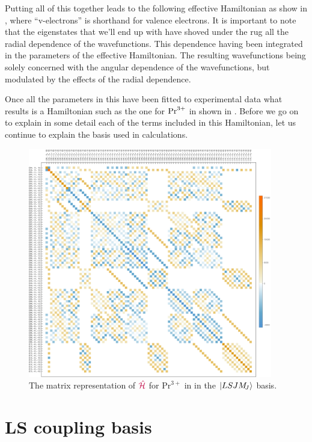 \documentclass[11pt, twoside,openright]{article}
\begin{document}
Putting all of this together leads to the following effective Hamiltonian as show in , where ``v-electrons'' is shorthand for valence electrons. It is important to note that the eigenstates that we'll end up with have shoved under the rug all the radial dependence of the wavefunctions. This dependence having been integrated in the parameters of the effective Hamiltonian. The resulting wavefunctions being solely concerned with the angular dependence of the wavefunctions, but modulated by the effects of the radial dependence.



Once all the parameters in this \hamilton have been fitted to experimental data what results is a Hamiltonian such as the one for $\textrm{Pr}^{3+}$ in \LaFthree shown in . Before we go on to explain in some detail each of the terms included in this Hamiltonian, let us continue to explain the basis used in calculations.

\begin{figure}[h!]
	\begin{center}
		\includegraphics[width=0.95\textwidth]{./figures/Prplot.pdf}
	\end{center}
	\caption{The matrix representation of $\textcolor{purple}{\hat{\mathcal{H}}}$ for $\text{Pr}^{3+}$ in \LaFthree in the $|LSJM_{\!{J}}\rangle$ basis.}
	\label{fig:Pr_in_LaF3} 
\end{figure}

\section{LS coupling basis}\label{section:ls-basis}
\end{document}
